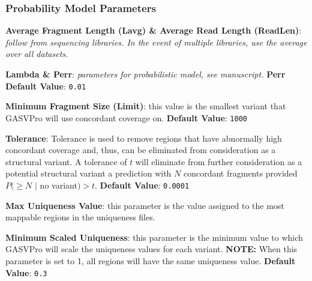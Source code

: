 \documentclass[11pt]{article}
\begin{document}
\subsubsection{Probability Model Parameters}
\begin {description}
\item {\bf Average Fragment Length (Lavg) \& Average Read Length (ReadLen)}: {\em follow from sequencing libraries. In the event of multiple libraries, use the average over all datasets.}
\item{\bf Lambda \& Perr}: {\em parameters for probabilistic model, see manuscript.} {\bf Perr Default Value}: \verb+0.01+
\item {\bf Minimum Fragment Size (Limit)}: this value is the smallest variant that GASVPro will use concordant coverage on. {\bf Default Value}: \verb+1000+
\item {\bf Tolerance}:  Tolerance is used to remove regions that have abnormally high
concordant coverage and, thus, can be eliminated from consideration
as a structural variant. A tolerance of $t$ will eliminate from further consideration as a potential structural variant a prediction with $N$ concordant fragments provided $P(\ge N$ $|$ no variant$) > t$. {\bf Default Value}: \verb+0.0001+
\item{\bf Max Uniqueness Value}:  this parameter is the value assigned to the most mappable regions in the uniqueness files. 
\item{\bf Minimum Scaled Uniqueness}:  this parameter is the minimum value to which GASVPro will scale the uniqueness values for each variant. {\bf NOTE:} When this parameter is set to 1, all regions will have the same uniqueness value. {\bf Default Value}: \verb+0.3+
\end{description}
\end{document}
